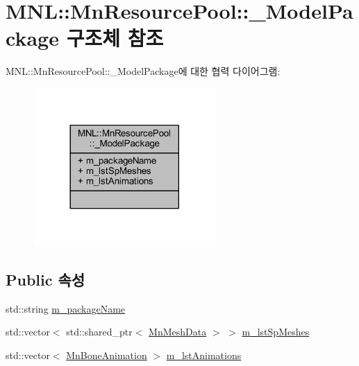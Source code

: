 \hypertarget{struct_m_n_l_1_1_mn_resource_pool_1_1___model_package}{}\section{M\+NL\+:\+:Mn\+Resource\+Pool\+:\+:\+\_\+\+Model\+Package 구조체 참조}
\label{struct_m_n_l_1_1_mn_resource_pool_1_1___model_package}


M\+NL\+:\+:Mn\+Resource\+Pool\+:\+:\+\_\+\+Model\+Package에 대한 협력 다이어그램\+:\nopagebreak
\begin{figure}[H]
\begin{center}
\leavevmode
\includegraphics[width=197pt]{struct_m_n_l_1_1_mn_resource_pool_1_1___model_package__coll__graph}
\end{center}
\end{figure}
\subsection*{Public 속성}
\begin{DoxyCompactItemize}
\item 
std\+::string \hyperlink{struct_m_n_l_1_1_mn_resource_pool_1_1___model_package_ae206cfd79820ffa3e4d30169b977a068}{m\+\_\+package\+Name}
\item 
std\+::vector$<$ std\+::shared\+\_\+ptr$<$ \hyperlink{class_m_n_l_1_1_mn_mesh_data}{Mn\+Mesh\+Data} $>$ $>$ \hyperlink{struct_m_n_l_1_1_mn_resource_pool_1_1___model_package_a6ce290b16db878c61570750b1135dd7f}{m\+\_\+lst\+Sp\+Meshes}
\item 
std\+::vector$<$ \hyperlink{class_m_n_l_1_1_mn_bone_animation}{Mn\+Bone\+Animation} $>$ \hyperlink{struct_m_n_l_1_1_mn_resource_pool_1_1___model_package_a6e22d7d1c02f3c8700ccd6aa89264624}{m\+\_\+lst\+Animations}
\end{DoxyCompactItemize}


